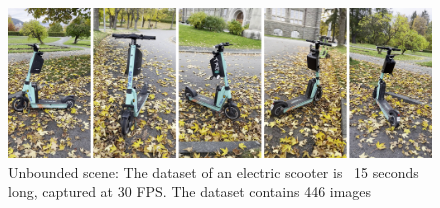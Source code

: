 \begin{figure}[!ht]
    \centering
    \includegraphics[width=1.0\textwidth]{figures/tier.png}
    \caption{Unbounded scene: The dataset of an electric scooter is ~15 seconds long, captured at 30 FPS. The dataset contains 446 images}
    \label{fig:tier}
\end{figure}
